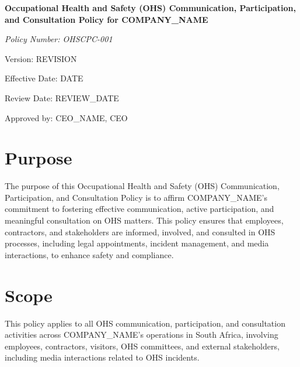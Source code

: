 \documentclass[12pt]{article}
\begin{document}
\begin{titlepage}
    \centering
    \vspace*{2cm}
    {\LARGE\bfseries Occupational Health and Safety (OHS) Communication, Participation, and Consultation Policy for {{COMPANY_NAME}}\par}
    \vspace{1cm}
    {\large\itshape Policy Number: OHSCPC-001\par}
    \vspace{0.5cm}
    {\normalsize Version: {{REVISION}}\par}
    \vspace{0.5cm}
    {\normalsize Effective Date: {{DATE}}\par}
    \vspace{0.5cm}
    {\normalsize Review Date: {{REVIEW_DATE}}\par}
    \vspace{2cm}
    {\normalsize Approved by: {{CEO_NAME}}, CEO\par}
\end{titlepage}

\section{Purpose}
The purpose of this Occupational Health and Safety (OHS) Communication, Participation, and Consultation Policy is to affirm {{COMPANY_NAME}}'s commitment to fostering effective communication, active participation, and meaningful consultation on OHS matters. This policy ensures that employees, contractors, and stakeholders are informed, involved, and consulted in OHS processes, including legal appointments, incident management, and media interactions, to enhance safety and compliance.

\section{Scope}
This policy applies to all OHS communication, participation, and consultation activities across {{COMPANY_NAME}}’s operations in South Africa, involving employees, contractors, visitors, OHS committees, and external stakeholders, including media interactions related to OHS incidents.
\end{document}
